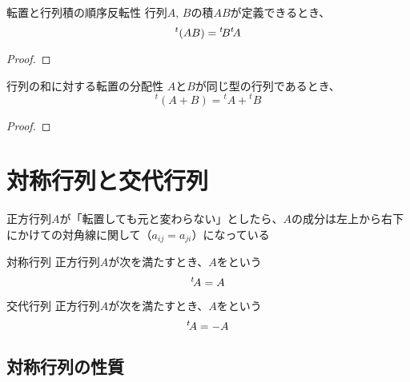 \documentclass[../../../topic_linear-algebra]{subfiles}
\begin{document}
\sectionline

\begin{theorem}{転置と行列積の順序反転性}\label{thm:transpose-of-product}
  行列$A,\,B$の積$AB$が定義できるとき、
  \begin{equation*}
    {}^t (AB) = {}^t\! B {}^t\! A
  \end{equation*}
\end{theorem}

\begin{proof}
\end{proof}

\sectionline

\begin{theorem}{行列の和に対する転置の分配性}\label{thm:transpose-distributes-over-sum}
  $A$と$B$が同じ型の行列であるとき、
  \begin{equation*}
    {}^t(A + B) = {}^t A + {}^t B
  \end{equation*}
\end{theorem}

\begin{proof}
  \todo{}
\end{proof}

\sectionline
\section{対称行列と交代行列}

正方行列$A$が「転置しても元と変わらない」としたら、$A$の成分は左上から右下にかけての対角線に関して（$a_{ij} = a_{ji}$）になっている

\begin{definition}{対称行列}\label{def:symmetric-matrix}
  正方行列$A$が次を満たすとき、$A$をという
  \begin{equation*}
    {}^t\! A = A
  \end{equation*}
\end{definition}

\begin{definition}{交代行列}
  正方行列$A$が次を満たすとき、$A$をという
  \begin{equation*}
    {}^t\! A = -A
  \end{equation*}
\end{definition}

\subsection{対称行列の性質}
\end{document}
